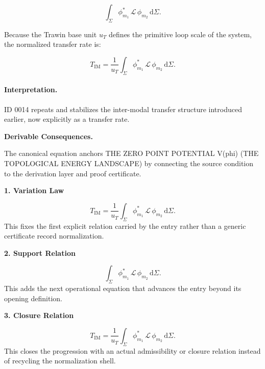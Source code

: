 \begin{equation}
\int_{\Sigma}
\phi_{m_1}^{*}
\,\mathcal{L}\,
\phi_{m_2}
\,\mathrm{d}\Sigma .
\end{equation}

Because the Trawin base unit $u_T$ defines the primitive loop scale of the system, the normalized transfer rate is:

\begin{equation}
\boxed{
T_{\mathrm{IM}}
=
\frac{1}{u_T}
\int_{\Sigma}
\phi_{m_1}^{*}
\,\mathcal{L}\,
\phi_{m_2}
\,\mathrm{d}\Sigma .
}
\end{equation}

\paragraph{Interpretation.}
ID 0014 repeats and stabilizes the inter-modal transfer structure introduced earlier, now explicitly as a transfer rate.

\par\vspace{0.35em}
\noindent\textbf{Derivable Consequences.}\quad
\begingroup
\footnotesize
\raggedright
The canonical equation anchors THE ZERO POINT POTENTIAL V(phi) (THE TOPOLOGICAL ENERGY LANDSCAPE) by connecting the source condition to the derivation layer and proof certificate.
\par\endgroup

\noindent\textbf{1. Variation Law}\par
\[
T_{\mathrm{IM}} = \frac{1}{u_T} \int_{\Sigma} \phi_{m_1}^{*} \,\mathcal{L}\, \phi_{m_2} \,\mathrm{d}\Sigma.
\]
\noindent This fixes the first explicit relation carried by the entry rather than a generic certificate record normalization.\par
\noindent\textbf{2. Support Relation}\par
\[
\int_{\Sigma} \phi_{m_1}^{*} \,\mathcal{L}\, \phi_{m_2} \,\mathrm{d}\Sigma.
\]
\noindent This adds the next operational equation that advances the entry beyond its opening definition.\par
\noindent\textbf{3. Closure Relation}\par
\[
\boxed{ T_{\mathrm{IM}} = \frac{1}{u_T} \int_{\Sigma} \phi_{m_1}^{*} \,\mathcal{L}\, \phi_{m_2} \,\mathrm{d}\Sigma. }
\]
\noindent This closes the progression with an actual admissibility or closure relation instead of recycling the normalization shell.\par

